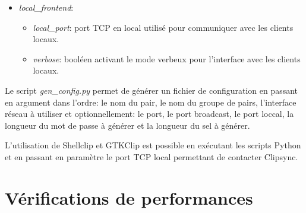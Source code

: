 \begin{itemize}
\begin{itemize}
    être copiées sur les autres pairs.
  \item \emph{keepalive\_delay}: délai en millisecondes après lequel la
    connexion est fermée si aucun message OK n'est reçu.
  \item \emph{keepalive\_interval}: interval en millisecondes utilisé pour
    l'envoi de messages OK.
  \item \emph{verbose}, \emph{verbose\_bcast}, \emph{verbose\_peer}:
    booléens permettant d'activer ou de désactiver le mode verbeux
    \footnote{Le mode verbeux permet d'afficher sur la sortie standard
    des informations sur l'activité du logiciel.} de Clipsync.
  \end{itemize}
\item \emph{local\_frontend}:
  \begin{itemize}
  \item \emph{local\_port}: port TCP en local utilisé pour communiquer avec les
    clients locaux.
  \item \emph{verbose}: booléen activant le mode verbeux pour l'interface avec
    les clients locaux.
  \end{itemize}
\end{itemize}

Le script \emph{gen\_config.py} permet de générer un fichier de configuration
en passant en argument dans l'ordre: le nom du pair, le nom du groupe de pairs,
l'interface réseau à utiliser et optionnellement: le port, le port broadcast,
le port loccal, la longueur du mot de passe à générer et la longueur du
sel à générer.

L'utilisation de Shellclip et GTKClip est possible en exécutant les scripts
Python et en passant en paramètre le port TCP local permettant de contacter
Clipsync.

\section{Vérifications de performances}
